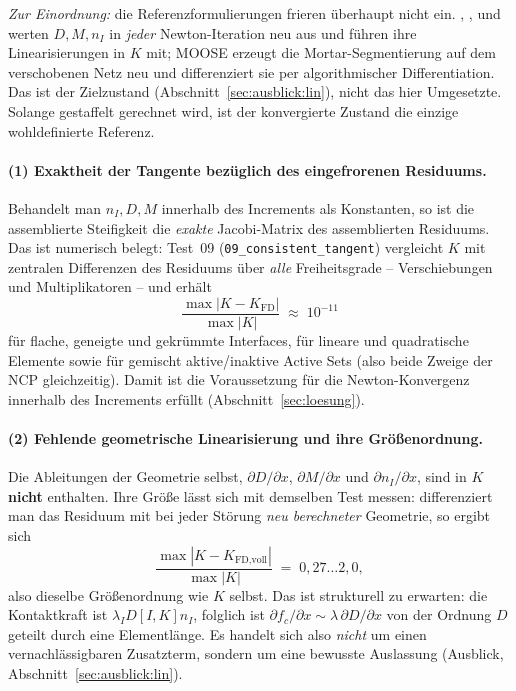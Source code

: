 \documentclass[a4paper,11pt]{article}
\def\bm#1{#1}%
\newcommand{\file}[1]{\texttt{\small #1}}
\begin{document}
\emph{Zur Einordnung:} die Referenzformulierungen frieren überhaupt nicht ein.
\citet{poppgeewall2009}, \citet{popp2010}, \citet{gitterle} und \citet[Kap.~4]{farah} werten
$\bm D,\bm M,\bm n_I$ in \emph{jeder} Newton-Iteration neu aus und führen ihre Linearisierungen in
$\bm K$ mit; MOOSE erzeugt die Mortar-Segmentierung auf dem verschobenen Netz neu und
differenziert sie per algorithmischer Differentiation. Das ist der Zielzustand
(Abschnitt~\ref{sec:ausblick:lin}), nicht das hier Umgesetzte. Solange gestaffelt gerechnet wird,
ist der konvergierte Zustand die einzige wohldefinierte Referenz.

\paragraph{(1) Exaktheit der Tangente bezüglich des eingefrorenen Residuums.}
Behandelt man $\bm n_I,\bm D,\bm M$ innerhalb des Increments als Konstanten, so ist die
assemblierte Steifigkeit die \emph{exakte} Jacobi-Matrix des assemblierten Residuums. Das ist
numerisch belegt: Test~09 (\file{09\_consistent\_tangent}) vergleicht $\bm K$ mit zentralen
Differenzen des Residuums über \emph{alle} Freiheitsgrade -- Verschiebungen und Multiplikatoren --
und erhält
\begin{equation}
\frac{\max|\bm K - \bm K_{\text{FD}}|}{\max|\bm K|} \;\approx\; 10^{-11}
\label{eq:fdcheck}
\end{equation}
für flache, geneigte und gekrümmte Interfaces, für lineare und quadratische Elemente sowie für
gemischt aktive/inaktive Active Sets (also beide Zweige der NCP gleichzeitig). Damit ist die
Voraussetzung für die Newton-Konvergenz innerhalb des Increments erfüllt
(Abschnitt~\ref{sec:loesung}).

\paragraph{(2) Fehlende geometrische Linearisierung und ihre Größenordnung.}
Die Ableitungen der Geometrie selbst, $\partial\bm D/\partial\bm x$,
$\partial\bm M/\partial\bm x$ und $\partial\bm n_I/\partial\bm x$, sind in $\bm K$
\textbf{nicht} enthalten. Ihre Größe lässt sich mit demselben Test messen: differenziert man
das Residuum mit bei jeder Störung \emph{neu berechneter} Geometrie, so ergibt sich
\begin{equation}
\frac{\max|\bm K - \bm K_{\text{FD,voll}}|}{\max|\bm K|} \;=\; 0{,}27 \ldots 2{,}0 ,
\end{equation}
also dieselbe Größenordnung wie $\bm K$ selbst. Das ist strukturell zu erwarten: die
Kontaktkraft ist $\lambda_I\bm D[I,K]\bm n_I$, folglich ist
$\partial\bm f_c/\partial\bm x\sim\lambda\,\partial\bm D/\partial\bm x$ von der Ordnung
$\bm D$ geteilt durch eine Elementlänge. Es handelt sich also \emph{nicht} um einen
vernachlässigbaren Zusatzterm, sondern um eine bewusste Auslassung
(Ausblick, Abschnitt~\ref{sec:ausblick:lin}).
\end{document}
